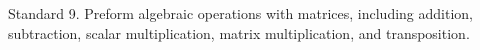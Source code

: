 Standard 9.	Preform algebraic operations with matrices, including addition, subtraction, scalar multiplication, matrix multiplication, and transposition.

\ifprintanswers
\else %
 \newpage
\fi

\begin{solution}
   
\end{solution}